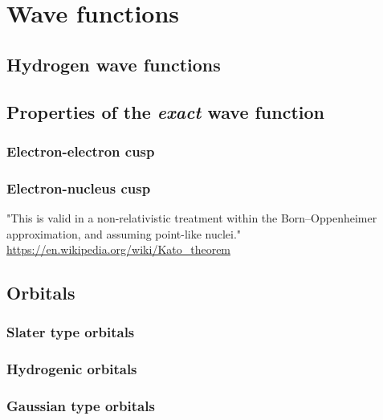 \documentclass[a4paper]{article}
\title{}
\date{}
\author{}
\newcommand{\R}{\mathbb{R}}
\begin{document}
\renewcommand{\R}{{\bf R}}
\renewcommand{\r}{{\bf r}}
\newcommand{\p}{{\bf p}}
\newcommand{\q}{{\bf q}}
\renewcommand{\H}{\mathcal{H}}
\newcommand{\psit}{\left|\psi(t)\right\rangle}


\section{Wave functions}

\subsection{Hydrogen wave functions}

\subsection{Properties of the \emph{exact} wave function}

\subsubsection{Electron-electron cusp}

\subsubsection{Electron-nucleus cusp}
"This is valid in a non-relativistic treatment within the Born–Oppenheimer approximation, and assuming point-like nuclei." \url{https://en.wikipedia.org/wiki/Kato_theorem}

\subsection{Orbitals}
\subsubsection{Slater type orbitals}
\subsubsection{Hydrogenic orbitals}
\subsubsection{Gaussian type orbitals}
\end{document}
